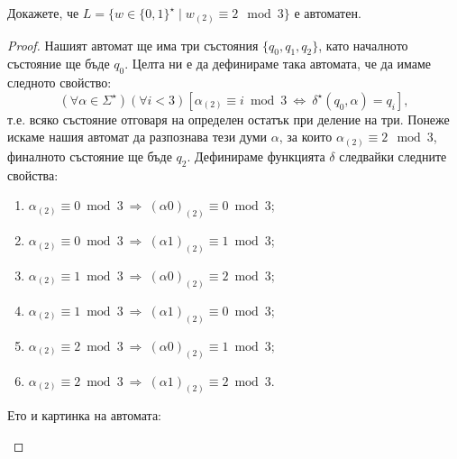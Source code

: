 \begin{problem}
  Докажете, че $L = \{w \in \{0,1\}^\star \mid w_{(2)} \equiv 2 \mod 3\}$ е автоматен.
\end{problem}
\begin{proof}
  Нашият автомат ще има три състояния $\{q_0,q_1,q_2\}$, като началното състояние ще бъде $q_0$.
  Целта ни е да дефинираме така автомата, че да имаме следното свойство:
  \[(\forall\alpha\in\Sigma^\star)(\forall i < 3)[\alpha_{(2)} \equiv i\bmod 3\ \Leftrightarrow\ \delta^\star(q_0,\alpha) = q_i],\]
  т.е. всяко състояние отговаря на определен остатък при деление на три.
  Понеже искаме нашия автомат да разпознава тези думи $\alpha$,
  за които $\alpha_{(2)} \equiv 2\mod 3$, финалното състояние ще бъде $q_2$.
  Дефинираме функцията $\delta$ следвайки следните свойства:
  \begin{enumerate}[(1)]
  \item
    $\alpha_{(2)} \equiv 0 \bmod 3\ \Rightarrow\ (\alpha0)_{(2)} \equiv 0 \bmod 3$;
  \item 
    $\alpha_{(2)} \equiv 0 \bmod 3\ \Rightarrow\ (\alpha1)_{(2)} \equiv 1 \bmod 3$;
  \item
    $\alpha_{(2)} \equiv 1 \bmod 3\ \Rightarrow\ (\alpha0)_{(2)} \equiv 2 \bmod 3$;
  \item 
    $\alpha_{(2)} \equiv 1 \bmod 3\ \Rightarrow\ (\alpha1)_{(2)} \equiv 0 \bmod 3$;
  \item
    $\alpha_{(2)} \equiv 2 \bmod 3\ \Rightarrow\ (\alpha0)_{(2)} \equiv 1 \bmod 3$;
  \item 
    $\alpha_{(2)} \equiv 2 \bmod 3\ \Rightarrow\ (\alpha1)_{(2)} \equiv 2 \bmod 3$.
  \end{enumerate}
  
  Ето и картинка на автомата:
  \begin{figure}[H]
    \begin{center}
\end{center}
\end{figure}
\end{proof}
